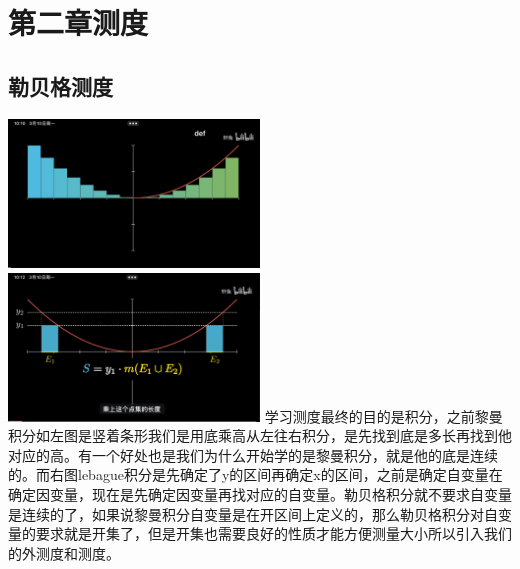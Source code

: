 \documentclass[lang=cn,10pt]{elegantbook}
\begin{document}
\chapter{第二章测度}
\section{勒贝格测度}
\includegraphics[width=0.5\textwidth]{image/lebegueimage.png}
\includegraphics[width=0.5\textwidth]{image/integralimage.png}
学习测度最终的目的是积分，之前黎曼积分如左图是竖着条形我们是用底乘高从左往右积分，是先找到底是多长再找到他对应的高。有一个好处也是我们为什么开始学的是黎曼积分，就是他的底是连续的。而右图lebague积分是先确定了y的区间再确定x的区间，之前是确定自变量在确定因变量，现在是先确定因变量再找对应的自变量。勒贝格积分就不要求自变量是连续的了，如果说黎曼积分自变量是在开区间上定义的，那么勒贝格积分对自变量的要求就是开集了，但是开集也需要良好的性质才能方便测量大小所以引入我们的外测度和测度。
\end{document}
